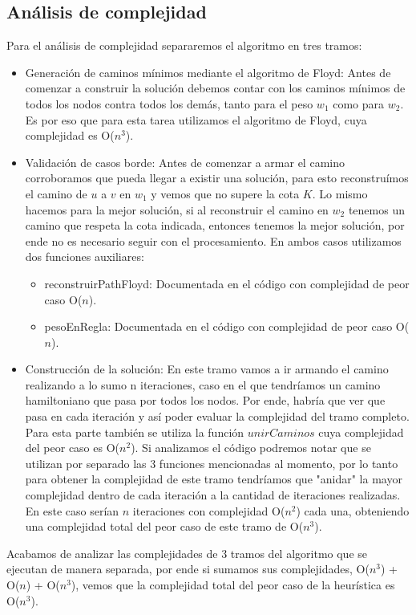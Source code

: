 \subsection{An\'alisis de complejidad}
Para el an\'alisis de complejidad separaremos el algoritmo en tres tramos:
\begin{itemize}
\item Generaci\'on de caminos m\'inimos mediante el algoritmo de Floyd:
	Antes de comenzar a construir la soluci\'on debemos contar con los caminos m\'inimos de todos los nodos contra todos los dem\'as, tanto para el peso $w_1$ como para $w_2$. Es por eso que para esta tarea utilizamos el algoritmo de Floyd, cuya complejidad es O($n^3$). 
\item Validaci\'on de casos borde:
	Antes de comenzar a armar el camino corroboramos que pueda llegar a existir una soluci\'on, para esto reconstru\'imos el camino de $u$ a $v$ en $w_1$ y vemos que no supere la cota $K$. 
	Lo mismo hacemos para la mejor soluci\'on, si al reconstruir el camino en $w_2$ tenemos un camino que respeta la cota indicada, entonces tenemos la mejor soluci\'on, por ende no es necesario seguir con el procesamiento.
	En ambos casos utilizamos dos funciones auxiliares:
	\begin{itemize}
	\item reconstruirPathFloyd: Documentada en el c\'odigo con complejidad de peor caso O($n$).
	\item pesoEnRegla: Documentada en el c\'odigo con complejidad de peor caso O($n$).
	\end{itemize}
\item Construcci\'on de la soluci\'on:
	En este tramo vamos a ir armando el camino realizando a lo sumo n iteraciones, caso en el que tendr\'iamos un camino hamiltoniano que pasa por todos los nodos. Por ende, habr\'ia que ver que pasa en cada iteraci\'on y as\'i poder evaluar la complejidad del tramo completo.
	Para esta parte tambi\'en se utiliza la funci\'on $unirCaminos$ cuya complejidad del peor caso es O($n^2$).
	Si analizamos el c\'odigo podremos notar que se utilizan por separado las 3 funciones mencionadas al momento, por lo tanto para obtener la complejidad de este tramo tendr\'iamos que "anidar" la mayor complejidad dentro de cada iteraci\'on a la cantidad de iteraciones realizadas. En este caso ser\'ian $n$ iteraciones con complejidad O($n^2$) cada una, obteniendo una complejidad total del peor caso de este tramo de O($n^3$).
\end{itemize}

Acabamos de analizar las complejidades de 3 tramos del algoritmo que se ejecutan de manera separada, por ende si sumamos sus complejidades, O($n^3$) + O($n$) + O($n^3$), vemos que la complejidad total del peor caso de la heur\'istica es O($n^3$).

